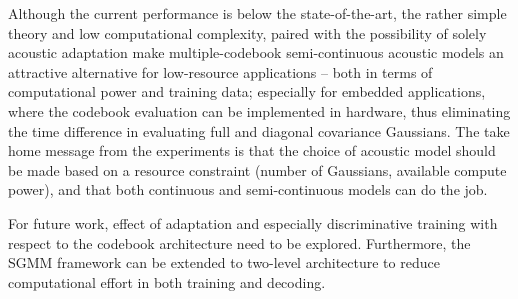 \documentclass{article}
\begin{document}
Although the current performance is below the state-of-the-art, the
rather simple theory and low computational complexity, paired with the possibility
of solely acoustic adaptation make multiple-codebook semi-continuous acoustic
models an attractive alternative for low-resource applications -- both in terms
of computational power and training data; especially for embedded applications,
where the codebook evaluation can be implemented in hardware, thus eliminating
the time difference in evaluating full and diagonal covariance Gaussians.
%
The take home message from the experiments is that the choice of acoustic model
should be made based on a resource constraint (number of Gaussians, available
compute power), and that both continuous and semi-continuous models can do the job.

For future work, effect of adaptation and especially discriminative training
with respect to the codebook architecture need to be explored.
Furthermore, the SGMM framework can be extended to two-level architecture to 
reduce computational effort in both training and decoding.


\footnotesize


\end{document}
